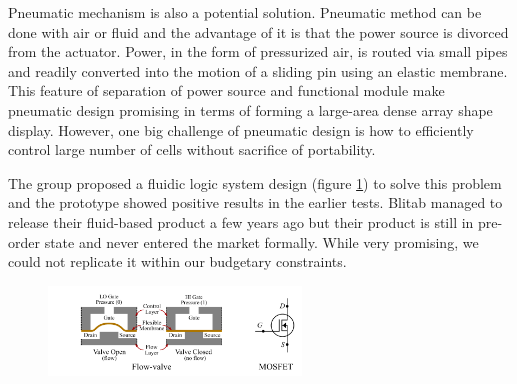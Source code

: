 Pneumatic mechanism is also a potential solution. Pneumatic method can be done with air or fluid and the advantage of it is that the power source is divorced from the actuator.
Power, in the form of pressurized air, is routed via small pipes and readily converted into the motion of a sliding pin using an elastic membrane.
This feature of separation of power source and functional module make pneumatic design promising in terms of forming a large-area dense array shape display.
However, one big challenge of pneumatic design is how to efficiently control large number of cells without sacrifice of portability.

The group proposed a fluidic logic system design (figure \ref{fig:pneumatic-schema}) to solve this problem and the prototype showed positive results in the earlier tests.
Blitab managed to release their fluid-based product a few years ago but their product is still in pre-order state and never entered the market formally.
While very promising, we could not replicate it within our budgetary constraints.
\begin{figure}\centering
    \includegraphics[width=0.6\textwidth]{figures/pneumatic-schema.png}
\caption{}
\label{fig:pneumatic-schema}
\end{figure}